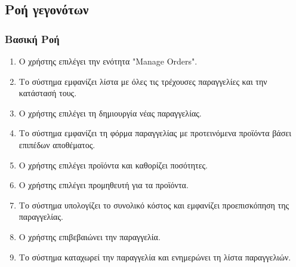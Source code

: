 \documentclass[12pt,a4paper,twoside]{book}
\begin{document}
\subsection{Ροή γεγονότων}

\subsubsection{Βασική Ροή}
\begin{enumerate}
  \item Ο χρήστης επιλέγει την ενότητα "Manage Orders". %
  \item Το σύστημα εμφανίζει λίστα με όλες τις τρέχουσες παραγγελίες και την κατάστασή τους.
  \item Ο χρήστης επιλέγει τη δημιουργία νέας παραγγελίας. %
  \item Το σύστημα εμφανίζει τη φόρμα παραγγελίας με προτεινόμενα προϊόντα βάσει επιπέδων αποθέματος. %
  \item Ο χρήστης επιλέγει προϊόντα και καθορίζει ποσότητες.
  \item Ο χρήστης επιλέγει προμηθευτή για τα προϊόντα.
  \item Το σύστημα υπολογίζει το συνολικό κόστος και εμφανίζει προεπισκόπηση της παραγγελίας.
  \item Ο χρήστης επιβεβαιώνει την παραγγελία.
  \item Το σύστημα καταχωρεί την παραγγελία και ενημερώνει τη λίστα παραγγελιών.
\end{enumerate}
\end{document}
